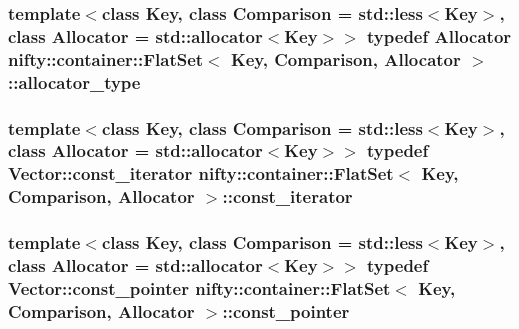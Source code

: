 \subsubsection[{allocator\+\_\+type}]{\setlength{\rightskip}{0pt plus 5cm}template$<$class Key, class Comparison = std\+::less$<$\+Key$>$, class Allocator = std\+::allocator$<$\+Key$>$$>$ typedef Allocator {\bf nifty\+::container\+::\+Flat\+Set}$<$ Key, Comparison, Allocator $>$\+::{\bf allocator\+\_\+type}}\label{classnifty_1_1container_1_1FlatSet_aafc00d7d957c81f01ee8cd5dcabb4c78}
\hypertarget{classnifty_1_1container_1_1FlatSet_a0f4cd26da060859b18742abfd534aa24}{}
\subsubsection[{const\+\_\+iterator}]{\setlength{\rightskip}{0pt plus 5cm}template$<$class Key, class Comparison = std\+::less$<$\+Key$>$, class Allocator = std\+::allocator$<$\+Key$>$$>$ typedef Vector\+::const\+\_\+iterator {\bf nifty\+::container\+::\+Flat\+Set}$<$ Key, Comparison, Allocator $>$\+::{\bf const\+\_\+iterator}}\label{classnifty_1_1container_1_1FlatSet_a0f4cd26da060859b18742abfd534aa24}
\hypertarget{classnifty_1_1container_1_1FlatSet_a87a82a407ecc181303e62a86b3132e38}{}
\subsubsection[{const\+\_\+pointer}]{\setlength{\rightskip}{0pt plus 5cm}template$<$class Key, class Comparison = std\+::less$<$\+Key$>$, class Allocator = std\+::allocator$<$\+Key$>$$>$ typedef Vector\+::const\+\_\+pointer {\bf nifty\+::container\+::\+Flat\+Set}$<$ Key, Comparison, Allocator $>$\+::{\bf const\+\_\+pointer}}\label{classnifty_1_1container_1_1FlatSet_a87a82a407ecc181303e62a86b3132e38}
\hypertarget{classnifty_1_1container_1_1FlatSet_a9fc6932b53d6a86ec15830e31805f8d4}{}
